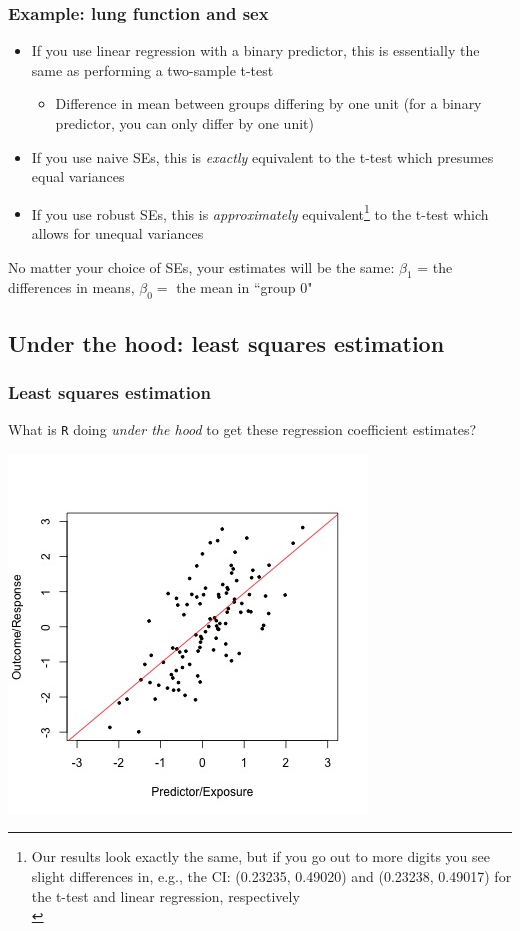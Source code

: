 \documentclass[12pt, 
hyperref={colorlinks=true, linkcolor=blue, urlcolor=cyan},dvipsnames]{beamer}
\begin{document}
\begin{frame}
\frametitle{Example: lung function and sex}

\begin{itemize}
\item \color{blue} If you use linear regression with a binary predictor, this is essentially the same as performing a two-sample t-test \color{black}
	\begin{itemize}
	\item Difference in mean between groups differing by one unit (for a binary predictor, you can only differ by one unit)
	\end{itemize}
\item If you use naive SEs, this is \textit{exactly} equivalent to the t-test which presumes equal variances
\item If you use robust SEs, this is \textit{approximately} equivalent\footnote[frame]{Our results look exactly the same, but if you go out to more digits you see slight differences in, e.g., the CI: (0.23235, 0.49020) and (0.23238, 0.49017) for the t-test and linear regression, respectively\\} to the t-test which allows for unequal variances
\end{itemize}

\vspace{-0.2cm} No matter your choice of SEs, your estimates will be the same: $\beta_1$ = the differences in means, $\beta_0 = $ the mean in ``group 0"


\end{frame}

\subsection{Under the hood: least squares estimation}
\begin{frame}
\frametitle{Least squares estimation}
What is \texttt{R} doing \textit{under the hood} to get these regression coefficient estimates?\vspace{-0.6cm} \pause 

\center \includegraphics[height=0.7\textheight]{./plots/linear-regr}
\end{frame}
\end{document}
